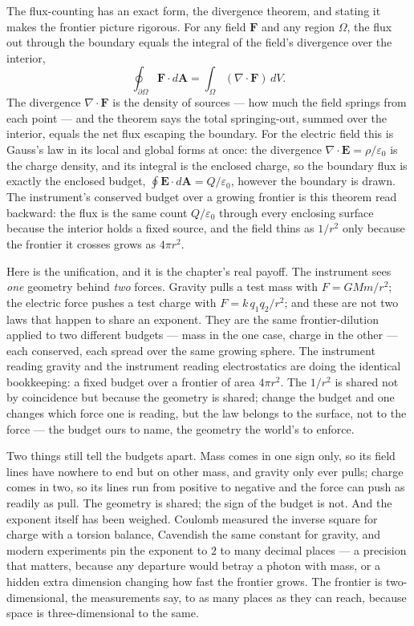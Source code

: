 The flux-counting has an exact form, the divergence theorem, and stating it makes the frontier picture
rigorous. For any field $\mathbf{F}$ and any region $\Omega$, the flux out through the boundary equals the
integral of the field's divergence over the interior,
\begin{equation}
  \oint_{\partial\Omega} \mathbf{F}\cdot d\mathbf{A} = \int_\Omega (\nabla\cdot\mathbf{F})\, dV .
\end{equation}
The divergence $\nabla\cdot\mathbf{F}$ is the density of sources --- how much the field springs from each point
--- and the theorem says the total springing-out, summed over the interior, equals the net flux escaping the
boundary. For the electric field this is Gauss's law in its local and global forms at once: the divergence
$\nabla\cdot\mathbf{E} = \rho/\varepsilon_0$ is the charge density, and its integral is the enclosed charge, so
the boundary flux is exactly the enclosed budget, $\oint \mathbf{E}\cdot d\mathbf{A} = Q/\varepsilon_0$,
however the boundary is drawn. The instrument's conserved budget over a growing frontier is this theorem read
backward: the flux is the same count $Q/\varepsilon_0$ through every enclosing surface because the interior
holds a fixed source, and the field thins as $1/r^2$ only because the frontier it crosses grows as $4\pi r^2$.

Here is the unification, and it is the chapter's real payoff. The instrument sees \emph{one} geometry behind
\emph{two} forces. Gravity pulls a test mass with $F = GMm/r^2$; the electric force pushes a test charge with
$F = k\,q_1 q_2/r^2$; and these are not two laws that happen to share an exponent. They are the same
frontier-dilution applied to two different budgets --- mass in the one case, charge in the other --- each
conserved, each spread over the same growing sphere. The instrument reading gravity and the instrument
reading electrostatics are doing the identical bookkeeping: a fixed budget over a frontier of area $4\pi r^2$.
The $1/r^2$ is shared not by coincidence but because the geometry is shared; change the budget and one
changes which force one is reading, but the law belongs to the surface, not to the force --- the budget ours to
name, the geometry the world's to enforce.

Two things still tell the budgets apart. Mass comes in one sign only, so its field lines have nowhere to end
but on other mass, and gravity only ever pulls; charge comes in two, so its lines run from positive to negative
and the force can push as readily as pull. The geometry is shared; the sign of the budget is not. And the
exponent itself has been weighed. Coulomb measured the inverse square for charge with a torsion balance,
Cavendish the same constant for gravity, and modern experiments pin the exponent to $2$ to many decimal places
--- a precision that matters, because any departure would betray a photon with mass, or a hidden extra
dimension changing how fast the frontier grows. The frontier is two-dimensional, the measurements say, to as
many places as they can reach, because space is three-dimensional to the same.

